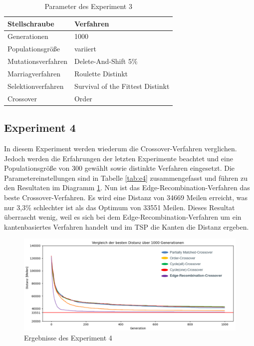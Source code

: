 \begin{table}[H]
\centering
\caption{Parameter des Experiment 3}
\begin{tabular}{ll}
Stellschraube & Verfahren \\
\hline
Generationen & 1000 \\
Populationsgröße & variiert \\
Mutationsverfahren & Delete-And-Shift 5\% \\
Marriagverfahren & Roulette Distinkt \\
Selektionverfahren & Survival of the Fittest Distinkt \\
Crossover & Order
\end{tabular}
\label{tab:e3}
\end{table}

\subsection{Experiment 4}
In diesem Experiment werden wiederum die Crossover-Verfahren verglichen. Jedoch werden die Erfahrungen der letzten Experimente beachtet und eine Populationsgröße von 300 gewählt sowie distinkte Verfahren eingesetzt.
Die Parametereinstellungen sind in Tabelle \ref{tab:e4} zusammengefasst und führen zu den Resultaten im Diagramm \ref{fig:experiment4}. Nun ist das Edge-Recombination-Verfahren das beste Crossover-Verfahren. Es wird eine Distanz von 34669 Meilen erreicht, was nur 3,3\% schlechter ist als das Optimum von 33551 Meilen. Dieses Resultat überrascht wenig, weil es sich bei dem Edge-Recombination-Verfahren um ein kantenbasiertes Verfahren handelt und im TSP die Kanten die Distanz ergeben.

\begin{figure}[H]
\centering
\includegraphics[width=1\textwidth]{img/Vortrag/experiment4.png}
\caption{Ergebnisse des Experiment 4}
\label{fig:experiment4}
\end{figure}


